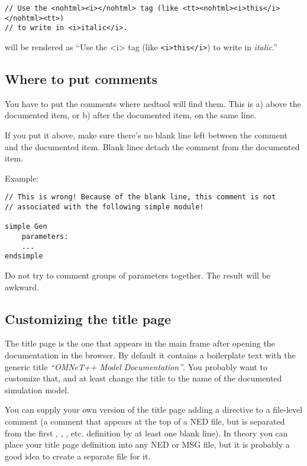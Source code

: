 \begin{verbatim}
// Use the <nohtml><i></nohtml> tag (like <tt><nohtml><i>this</i></nohtml><tt>)
// to write in <i>italic</i>.
\end{verbatim}

will be rendered as ``Use the <i> tag (like \texttt{<i>this</i>}) to write
in \textit{italic}.''



\subsection{Where to put comments}

You have to put the comments where nedtool will find them.
This is a) above the documented item, or b) after the
documented item, on the same line.

If you put it above, make sure there's no blank line left
between the comment and the documented item. Blank lines
detach the comment from the documented item.

Example:
\begin{verbatim}
// This is wrong! Because of the blank line, this comment is not
// associated with the following simple module!

simple Gen
    parameters:
    ...
endsimple
\end{verbatim}

Do not try to comment groups of parameters together. The result
will be awkward.


\subsection{Customizing the title page}

The title page is the one that appears in the main frame after
opening the documentation in the browser. By default it contains
a boilerplate text with the generic title \textit{``OMNeT++ Model Documentation''}.
You probably want to customize that, and at least change the title
to the name of the documented simulation model.

You can supply your own version of the title page adding a 
directive to a file-level comment (a comment that appears at the top of
a NED file, but is separated from the first , ,
, etc. definition by at least one blank line).
In theory you can place your title page definition into
any NED or MSG file, but it is probably a good idea to create
a separate  file for it.

